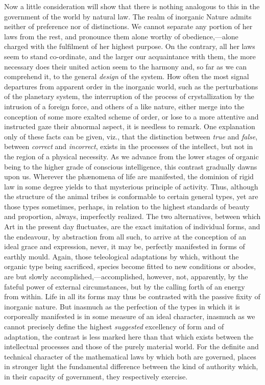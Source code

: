 \documentclass[oneside]{book}
\begin{document}
Now a little consideration will show that there is nothing
analogous to this in the government of the world by natural law.
The realm of inorganic Nature admits neither of preference nor
of distinctions. We cannot separate any portion of her laws
from the rest, and pronounce them alone worthy of obedience,---alone
charged with the fulfilment of her highest purpose. On
the contrary, all her laws seem to stand co-ordinate, and the
larger our acquaintance with them, the more necessary does their
united action seem to the harmony and, so far as we can comprehend
it, to the general \emph{design} of the system. How often the
most signal departures from apparent order in the inorganic
world, such as the perturbations of the planetary system, the interruption
of the process of crystallization by the intrusion of a
foreign force, and others of a like nature, either merge into the
conception of some more exalted scheme of order, or lose to a
more attentive and instructed gaze their abnormal aspect, it is
needless to remark. One explanation only of these facts can be
given, viz., that the distinction between \emph{true} and \emph{false}, between
\emph{correct} and \emph{incorrect}, exists in the processes of the intellect, but
not in the region of a physical necessity. As we advance from
the lower stages of organic being to the higher grade of conscious
intelligence, this contrast gradually dawns upon us. Wherever
the ph{\ae}nomena of life are manifested, the dominion of rigid law
in some degree yields to that mysterious principle of activity.
Thus, although the structure of the animal tribes is conformable
to certain general types, yet are those types sometimes, perhaps,
in relation to the highest standards of beauty and proportion,
always, imperfectly realized. The two alternatives, between
which Art in the present day fluctuates, are the exact imitation
of individual forms, and the endeavour, by abstraction from all
such, to arrive at the conception of an ideal grace and expression,
never, it may be, perfectly manifested in forms of earthly mould.
Again, those teleological adaptations by which, without the organic
type being sacrificed, species become fitted to new conditions
or abodes, are but slowly accomplished,---accomplished,
however, not, apparently, by the fateful power of external circumstances,
but by the calling forth of an energy from within.
Life in all its forms may thus be contrasted with the passive fixity
of inorganic nature. But inasmuch as the perfection of the types
in which it is corporeally manifested is in some measure of an
ideal character, inasmuch as we cannot precisely define the
highest \emph{suggested} excellency of form and of adaptation, the contrast
is less marked here than that which exists between the intellectual
processes and those of the purely material world. For
the definite and technical character of the mathematical laws by
which both are governed, places in stronger light the fundamental
difference between the kind of authority which, in their capacity
of government, they respectively exercise.
\end{document}
